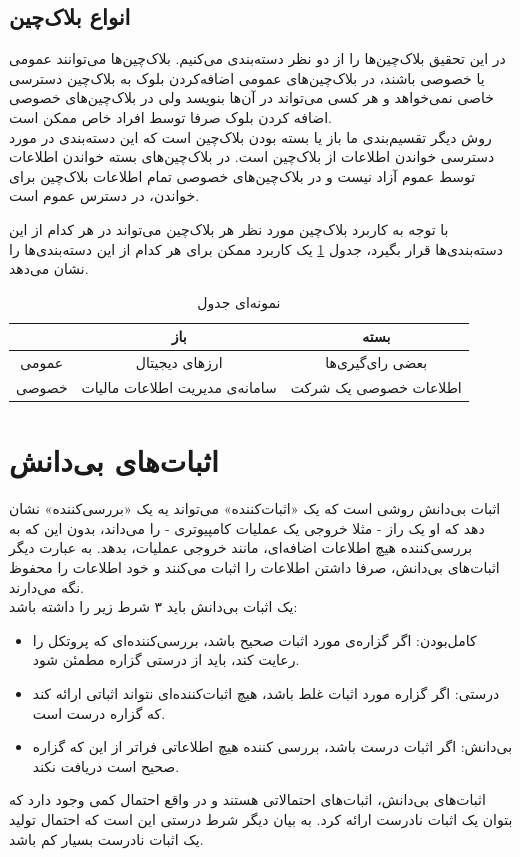  \subsection{انواع بلاک‌چین}
 در این تحقیق بلاک‌چین‌ها را از دو نظر دسته‌‌بندی می‌کنیم. بلاک‌چین‌ها می‌توانند عمومی یا خصوصی باشند، در بلاک‌چین‌های عمومی اضافه‌کردن بلوک به بلاک‌چین دسترسی خاصی نمی‌خواهد و هر کسی می‌تواند در آن‌ها بنویسد ولی در بلاک‌چین‌های خصوصی اضافه کردن بلوک صرفا توسط افراد خاص ممکن است. 
 \\
 روش دیگر تقسیم‌بندی ما باز یا بسته بودن بلاک‌چین است که این دسته‌بندی در مورد دسترسی خواندن اطلاعات از بلاک‌چین است. در بلاک‌چین‌های بسته خواندن اطلاعات توسط عموم آزاد نیست و در بلاک‌چین‌های خصوصی تمام اطلاعات بلاک‌چین برای خواندن، در دسترس عموم است. 
\par
با توجه به کاربرد بلاک‌چین مورد نظر هر بلاک‌چین می‌تواند در هر کدام از این دسته‌بندی‌ها قرار بگیرد، جدول  \ref{tab:tch} یک کاربرد ممکن برای هر کدام از این دسته‌بندی‌ها را نشان می‌دهد.

\begin{table}[h]
	\begin{center}
		\caption{نمونه‌ای جدول}
		\begin{tabular}{|c|c|c|}
			\hline
			& باز & بسته \\
			\hline
			عمومی & ارز‌های دیجیتال & بعضی رای‌گیری‌ها \\
			\hline
			خصوصی & سامانه‌ی مدیریت اطلاعات مالیات & اطلاعات خصوصی یک شرکت \\
			\hline

		\end{tabular}
		\label{tab:tch}
	\end{center}
\end{table}


 
 
\section{اثبات‌های بی‌دانش}
اثبات‌ بی‌دانش 
روشی است که یک «اثبات‌کننده» می‌تواند یه یک «بررسی‌کننده» نشان دهد که او یک راز - مثلا خروجی یک عملیات کامپیوتری - را می‌داند، بدون این که به بررسی‌کننده هیچ اطلاعات اضافه‌ای، مانند خروجی عملیات، بدهد. به عبارت دیگر اثبات‌های بی‌دانش، صرفا داشتن اطلاعات را اثبات می‌کنند و خود اطلاعات را محفوظ نگه‌ می‌دارند.
\\
یک اثبات بی‌دانش باید ۳ شرط زیر را داشته باشد:
\begin{itemize}
	\item
	کامل‌بودن: اگر گزاره‌ی مورد اثبات صحیح باشد، بررسی‌کننده‌ای که پروتکل را رعایت کند، باید از درستی گزاره مطمئن شود.
	\item 
	درستی: اگر گزاره مورد اثبات غلط باشد، هیچ اثبات‌کننده‌ای نتواند اثباتی ارائه کند که گزاره درست است. 
	\item 
	بی‌دانش: اگر اثبات درست باشد، بررسی کننده هیچ اطلاعاتی فراتر از این که گزاره صحیح است دریافت نکند.
\end{itemize}
اثبات‌های بی‌دانش، اثبات‌های احتمالاتی هستند و در واقع احتمال کمی وجود دارد که بتوان یک اثبات نادرست ارائه کرد. به بیان دیگر شرط درستی این است که احتمال تولید یک اثبات نادرست بسیار کم باشد. 
